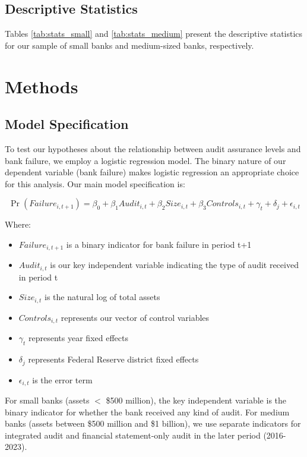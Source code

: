 \documentclass[12pt]{article}
\begin{document}
\subsection{Descriptive Statistics}

Tables \ref{tab:stats_small} and \ref{tab:stats_medium} present the descriptive statistics for our sample of small banks and medium-sized banks, respectively.

\section{Methods}

\subsection{Model Specification}

To test our hypotheses about the relationship between audit assurance levels and bank failure, we employ a logistic regression model. The binary nature of our dependent variable (bank failure) makes logistic regression an appropriate choice for this analysis. Our main model specification is:

$$\Pr(Failure_{i,t+1}) = \beta_0 + \beta_1 Audit_{i,t} + \beta_2 Size_{i,t} + \beta_3 Controls_{i,t} + \gamma_t + \delta_j + \epsilon_{i,t}$$

Where:

\begin{itemize}
    \item $Failure_{i,t+1}$ is a binary indicator for bank failure in period t+1
    \item $Audit_{i,t}$ is our key independent variable indicating the type of audit received in period t
    \item $Size_{i,t}$ is the natural log of total assets
    \item $Controls_{i,t}$ represents our vector of control variables
    \item $\gamma_t$ represents year fixed effects
    \item $\delta_j$ represents Federal Reserve district fixed effects
    \item $\epsilon_{i,t}$ is the error term
\end{itemize}

For small banks (assets $<$ \$500 million), the key independent variable is the binary indicator for whether the bank received any kind of audit. For medium banks (assets between \$500 million and \$1 billion), we use separate indicators for integrated audit and financial statement-only audit in the later period (2016-2023).
\end{document}
